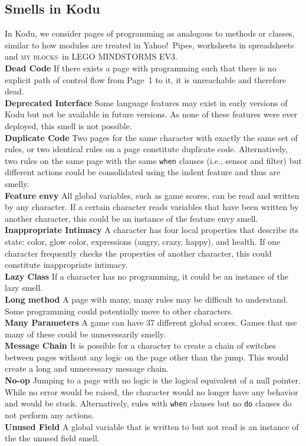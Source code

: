\documentclass[conference]{IEEEtran}
\newcommand{\ms}{LEGO MINDSTORMS EV3}
\newcommand{\mbs}{\textsc{my blocks}}
\begin{document}
\subsection{Smells in Kodu}
In Kodu, we consider pages of programming as analogous to methods or classes, similar to how modules are treated in Yahoo!\ Pipes, worksheets in spreadsheets and \mbs~in \ms. \\
\textbf{Dead Code} If there exists a page with programming such that there is no explicit path of control flow from Page~1 to it, it is unreachable and therefore dead. \\
\textbf{Deprecated Interface} Some language features may exist in early versions of Kodu but not be available in future versions. As none of these features were ever deployed, this smell is not possible. \\
\textbf{Duplicate Code} Two pages for the same character with exactly the same set of rules, or two identical rules on a page constitute duplicate code. Alternatively, two rules on the same page with the same {\tt when} clauses (i.e., sensor and filter) but different actions could be consolidated using the indent feature and thus are smelly. \\
\textbf{Feature envy} All global variables, such as game scores, can be read and written by any character. If a certain character reads variables that have been written by another character, this could be an instance of the feature envy smell. \\
\textbf{Inappropriate Intimacy} A character has four local properties that describe its state: color, glow color, expressions (angry, crazy, happy), and health.  If one character frequently checks the properties of another character, this could constitute inappropriate intimacy. \\
\textbf{Lazy Class} If a character has no programming, it could be an instance of the lazy smell. \\
\textbf{Long method} A page with many, many rules may be difficult to understand. Some programming could potentially move to other characters.\\ %
\textbf{Many Parameters} A game can have 37 different global scores. Games that use many of these could be unnecessarily smelly. \\%
\textbf{Message Chain} It is possible for a character to create a chain of switches between pages without any logic on the page other than the jump. This would create a long and unnecessary message chain. \\
\textbf{No-op} Jumping to a page with no logic is the logical equivalent of a null pointer. While no error would be raised, the character would no longer have any behavior and would be stuck. Alternatively, rules with {\tt when} clauses but no {\tt do} clauses do not perform any actions. \\
\textbf{Unused Field} A global variable that is written to but not read is an instance of the the unused field smell. \\
\end{document}
